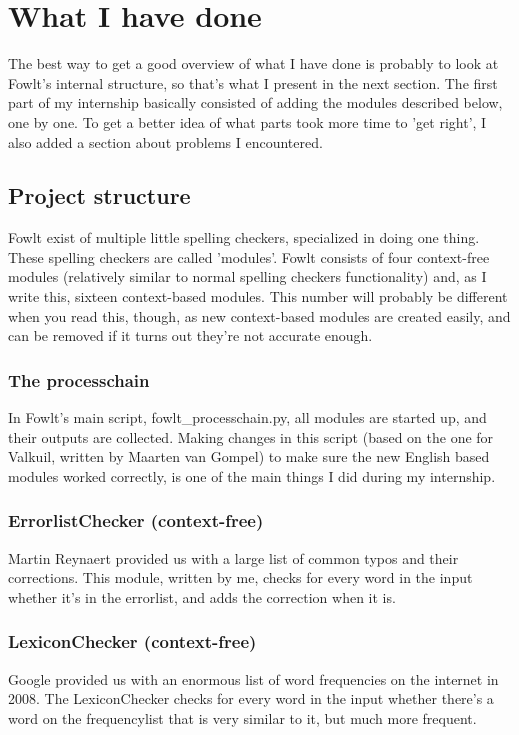 \documentclass[12pt]{article}
\begin{document}
\section{What I have done}
The best way to get a good overview of what I have done is probably to look at Fowlt's internal structure, so that's what I present in the next section. The first part of my internship basically consisted of adding the modules described below, one by one. To get a better idea of what parts took more time to 'get right', I also added a section about problems I encountered.

\subsection{Project structure}
Fowlt exist of multiple little spelling checkers, specialized in doing one thing. These spelling checkers are called 'modules'. Fowlt consists of four context-free modules (relatively similar to normal spelling checkers functionality) and, as I write this, sixteen context-based modules. This number will probably be different when you read this, though, as new context-based modules are created easily, and can be removed if it turns out they're not accurate enough.

\subsubsection{The processchain}
In Fowlt's main script, fowlt\_processchain.py, all modules are started up, and their outputs are collected. Making changes in this script (based on the one for Valkuil, written by Maarten van Gompel) to make sure the new English based modules worked correctly, is one of the main things I did during my internship.

\subsubsection{ErrorlistChecker (context-free)}
Martin Reynaert provided us with a large list of common typos and their corrections. This module, written by me, checks for every word in the input whether it's in the errorlist, and adds the correction when it is.

\subsubsection{LexiconChecker (context-free)}
Google provided us with an enormous list of word frequencies on the internet in 2008. The LexiconChecker checks for every word in the input whether there's a word on the frequencylist that is very similar to it, but much more frequent.
\end{document}
